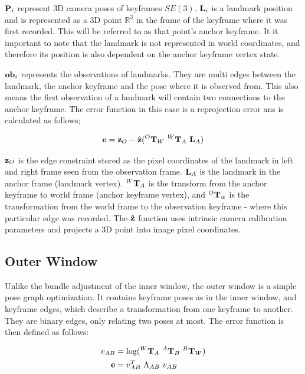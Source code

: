 $\mathbf P_i$ represent 3D camera poses of keyframes $SE(3)$.  $\mathbf L_i$ is a landmark position and is represented as a 3D point $\mathbb{R}^3$ in the frame of the keyframe where it was first recorded.  This will be referred to as that point's anchor keyframe.  It it important to note that the landmark is not represented in world coordinates, and therefore its position is also dependent on the anchor keyframe vertex state.

$\mathbf {ob}_i$ represents the observations of landmarks.  They are multi edges between the landmark, the anchor keyframe and the pose where it is observed from.  This also means the first observation of a landmark will contain two connections to the anchor keyframe. The error function in this case is a reprojection error ans is calculated as follows;

\begin{align}
 \mathbf e = \mathbf z_O - \hat{\mathbf z}( ^{O}\mathbf T_W \ ^W \mathbf T_{A} \ \mathbf L_{A})
\end{align}

$\mathbf z_O$ is the edge constraint stored as the pixel coordinates of the landmark in left and right frame seen from the observation  frame. $\mathbf L_{A}$ is the landmark in the anchor frame (landmark vertex).  $^W \mathbf T_{A}$ is the transform from the anchor keyframe to world frame (anchor keyframe vertex), and $^{O}\mathbf T_w$ is the transformation from the world frame to the observation keyframe -  where this particular edge was recorded.  The $\hat{\mathbf z}$ function uses intrinsic camera calibration parameters and projects a 3D point into image pixel coordinates.

\subsection{Outer Window}

Unlike the bundle adjustment of the inner window, the outer window is a simple pose graph optimization.  It contains keyframe poses as in the inner window, and keyframe edges, which describe a transformation from one keyframe to another.  They are binary edges, only relating two poses at most.  The error function is then defined as follows:

\begin{align}
 v_{AB} &=  \log(^{W}\mathbf T_{A} \ ^{A} \mathbf T_{B} \ ^{B} \mathbf T_{W}) \\
 \mathbf e &= v_{AB}^T \ \Lambda_{AB} \ v_{AB}
\end{align}

